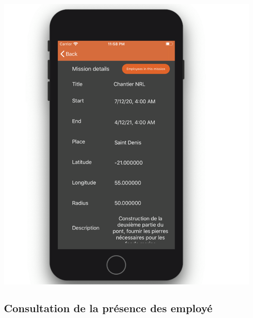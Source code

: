\documentclass{article}
\begin{document}
\begin{center}
    \includegraphics[scale=0.15]{detailMIOS.png}
\end{center}

\newpage

\subsection{Consultation de la présence des employé }
\end{document}
